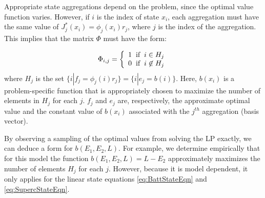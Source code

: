 \documentclass[conference]{IEEEtran}
\begin{document}
    Appropriate state aggregations depend on the problem, since the optimal value function varies. %
    However, if $i$ is the index of state $x_{i}$, each aggregation must have the same value of $J^{*}_{j}(x_{i}) = \phi_{j}(x_{i})r_{j}$, where $j$ is the index of the aggregation. This implies that the matrix $\Phi$ must have the form:
    
    \begin{displaymath}
        \Phi_{i,j}=\left\{
            \begin{array}{l}
            1 \hspace{0.2cm} \text{if} \hspace{0.2cm} i\in H_{j}\\
            0 \hspace{0.2cm} \text{if} \hspace{0.2cm} i\not\in H_{j}
            \end{array}
            \right.
    \end{displaymath}where $H_{j}$ is the set $\{i|f_{j} = \phi_{j}(i)r_{j}\}=\{i|e_{j} = b(i)\}$. Here, $b(x_{i})$ is a problem-specific function that is appropriately chosen to maximize the number of elements in $H_{j}$ for each $j$. $f_{j}$ and $e_{j}$ are, respectively, the approximate optimal value and the constant value of $b(x_{i})$ associated with the $j^{th}$ aggregation (basis vector).
    
    By observing a sampling of the optimal values from solving the LP exactly, we can deduce a form for $b(E_{1},E_{2},L)$. For example, we determine empirically that for this model the function $b(E_{1},E_{2},L)=L-E_{2}$ approximately maximizes the number of elements $H_{j}$ for each $j$. However, because it is model dependent, it only applies for the linear state equations \eqref{eq:BattStateEqn} and \eqref{eq:SupercStateEqn}. %
	
\end{document}
